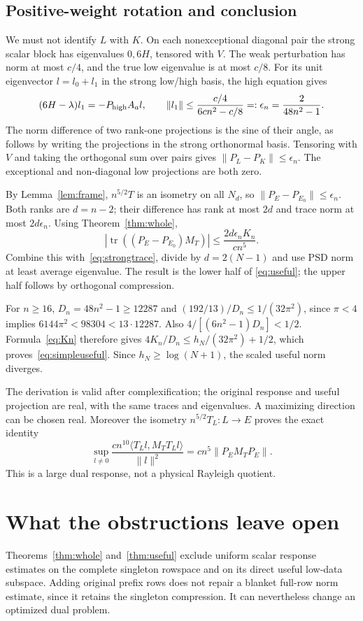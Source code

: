\documentclass[11pt]{article}
\newcommand{\norm}[1]{\lVert#1\rVert}
\newcommand{\ip}[2]{\langle#1,#2\rangle}
\DeclareMathOperator{\tr}{tr}
\theoremstyle{definition}
\theoremstyle{remark}
\begin{document}
\subsection{Positive-weight rotation and conclusion}
We must not identify $L$ with $K$. On each nonexceptional diagonal pair
the strong scalar block has eigenvalues $0,6H$, tensored with $V$.
The weak perturbation has norm at most $c/4$, and the true low eigenvalue
is at most $c/8$. For its unit eigenvector $l=l_0+l_1$ in the strong
low/high basis, the high equation gives
\[
 (6H-\lambda)l_1=-P_{\rm high}A_al,\qquad
 \norm{l_1}\le\frac{c/4}{6cn^2-c/8}
                     =:\epsilon_n=\frac2{48n^2-1}.
\]
The norm difference of two rank-one projections is the sine of their
angle, as follows by writing the projections in the strong orthonormal
basis. Tensoring with $V$ and taking the orthogonal sum over pairs gives
$\norm{P_L-P_K}\le\epsilon_n$. The exceptional and non-diagonal low
projections are both zero.

By Lemma~\ref{lem:frame}, $n^{5/2}T$ is an isometry on all $N_d$, so
$\norm{P_E-P_{E_0}}\le\epsilon_n$. Both ranks are $d=n-2$; their
difference has rank at most $2d$ and trace norm at most $2d\epsilon_n$.
Using Theorem~\ref{thm:whole},
\[
 |\tr((P_E-P_{E_0})M_T)|\le\frac{2d\epsilon_nK_n}{cn^5}.
\]
Combine this with~\eqref{eq:strongtrace}, divide by $d=2(N-1)$ and use
PSD norm at least average eigenvalue. The result is the lower half of
\eqref{eq:useful}; the upper half follows by orthogonal compression.

For $n\ge16$, $D_n=48n^2-1\ge12287$ and
$(192/13)/D_n\le1/(32\pi^2)$, since $\pi<4$ implies
$6144\pi^2<98304<13\cdot12287$. Also
$4/[(6n^2-1)D_n]<1/2$. Formula~\eqref{eq:Kn} therefore gives
$4K_n/D_n\le h_N/(32\pi^2)+1/2$, which proves~\eqref{eq:simpleuseful}.
Since $h_N\ge\log(N+1)$, the scaled useful norm diverges.

The derivation is valid after complexification; the original response and
useful projection are real, with the same traces and eigenvalues. A
maximizing direction can be chosen real. Moreover the isometry
$n^{5/2}T_L:L\to E$ proves the exact identity
\[
 \sup_{l\ne0}\frac{cn^{10}\ip{T_Ll}{M_TT_Ll}}{\norm l^2}
                   =cn^5\norm{P_EM_TP_E}.
\]
This is a large dual response, not a physical Rayleigh quotient.

\section{What the obstructions leave open}\label{sec:limits}
Theorems~\ref{thm:whole} and~\ref{thm:useful} exclude uniform scalar
response estimates on the complete singleton rowspace and on its direct
useful low-data subspace. Adding original prefix rows does not repair a
blanket full-row norm estimate, since it retains the singleton compression.
It can nevertheless change an optimized dual problem.
\end{document}
